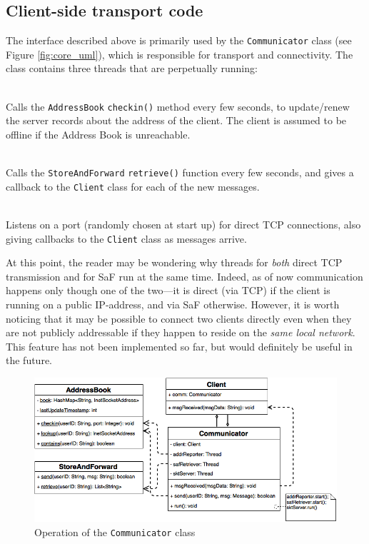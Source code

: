 \documentclass[a4paper, twoside, 12pt]{report}
\begin{document}

\subsection{Client-side transport code}
\label{subsec:impl.prep.transport}
The interface described above is primarily used by the \texttt{Communicator} class (see Figure \ref{fig:core_uml}), which is responsible for transport and connectivity. The class contains three threads that are perpetually running:
\begin{description}[labelindent=0.5cm, leftmargin=1.3cm, rightmargin=0.5cm]
    \item[Address-reporting thread] \hfill \\
        Calls the \texttt{AddressBook} \texttt{checkin()} method every few seconds, to update/renew the server records about the address of the client. The client is assumed to be offline if the Address Book is unreachable.
    \item[SaF Querying Thread] \hfill \\
        Calls the \texttt{StoreAndForward} \texttt{retrieve()} function every few seconds, and gives a callback to the \texttt{Client} class for each of the new messages.
    \item[TCP Socket Server Thread] \hfill \\
        Listens on a port (randomly chosen at start up) for direct TCP connections, also giving callbacks to the \texttt{Client} class as messages arrive.
\end{description}
At this point, the reader may be wondering why threads for \emph{both} direct TCP transmission and for SaF run at the same time. Indeed, as of now communication happens only though one of the two---it is direct (via TCP) if the client is running on a public IP-address, and via SaF otherwise. However, it is worth noticing that it may be possible to connect two clients directly even when they are not publicly addressable if they happen to reside on the \emph{same local network}. This feature has not been implemented so far, but would definitely be useful in the future. 


\begin{figure}[H]
\centering
\includegraphics[width = 0.8 \linewidth]{pics/communicator_uml.png}
\caption{\label{fig:communicator_uml} Operation of the \texttt{Communicator} class}
\end{figure}
\end{document}
